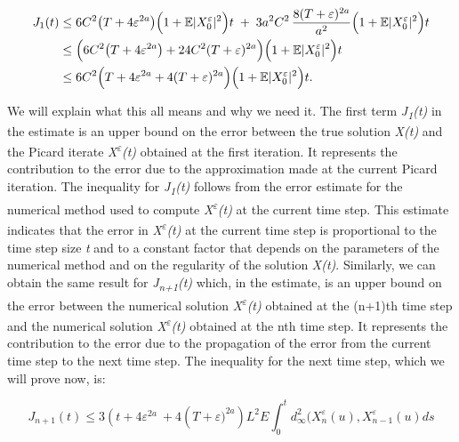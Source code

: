 \documentclass[12pt,a4paper]{report}
\numberwithin{equation}{section}
\begin{document}
\[
\begin{aligned}
J_{1}(t)
&\le 6C^{2}\bigl(T+4\varepsilon^{2a}\bigr)
\Bigl(1+\mathbb{E}\lvert X_{0}^{\varepsilon}\rvert^{2}\Bigr)t
\;+\;3a^{2}C^{2}\,\frac{8(T+\varepsilon)^{2a}}{a^{2}}
\Bigl(1+\mathbb{E}\lvert X_{0}^{\varepsilon}\rvert^{2}\Bigr)t \\
&\le \Bigl(6C^{2}\bigl(T+4\varepsilon^{2a}\bigr)+24C^{2}(T+\varepsilon)^{2a}\Bigr)
\Bigl(1+\mathbb{E}\lvert X_{0}^{\varepsilon}\rvert^{2}\Bigr)t \\
&\le 6C^{2}\Bigl(T+4\varepsilon^{2a}+4(T+\varepsilon)^{2a}\Bigr)
\Bigl(1+\mathbb{E}\lvert X_{0}^{\varepsilon}\rvert^{2}\Bigr)t .
\end{aligned}
\]


We will explain what this all means and why we need it. The first term
\emph{J\textsubscript{1}(t)} in the estimate is an upper bound on the
error between the true solution \emph{X(t)} and the Picard iterate
\emph{X\textsuperscript{$\varepsilon$}(t)} obtained at the
first iteration. It represents the contribution to
the error due to the approximation made at the current Picard iteration. The inequality for \emph{J\textsubscript{1}(t)}
follows from the error estimate for the numerical method used to compute
\emph{X\textsuperscript{$\varepsilon$}(t)} at the current time step. This estimate
indicates that the error in \emph{X\textsuperscript{$\varepsilon$}(t)} at the
current time step is proportional to the time step size \emph{t} and to
a constant factor that depends on the parameters of the numerical method
and on the regularity of the solution \emph{X(t)}. Similarly, we can
obtain the same result for \emph{J\textsubscript{n+1}(t)} which, in the
estimate, is an upper bound on the error between the numerical solution
\emph{X\textsuperscript{$\varepsilon$}(t)} obtained at the (n+1)th time step and the
numerical solution \emph{X\textsuperscript{$\varepsilon$}(t)} obtained at the nth
time step. It represents the contribution to the error due to the
propagation of the error from the current time step to the next time
step. The inequality for the next time step, which we will prove now,
is:

\[J_{n + 1}(t) \leq 3\left( t + 4\varepsilon^{2a} \right.\  + 4(T + {\varepsilon)}^{2a})L^{2}E\int_{0}^{t}{d_{\infty}^{2}(X_{n}^{\varepsilon}(u),X_{n - 1}^{\varepsilon}}(u)ds\]
\end{document}
